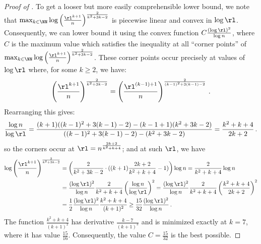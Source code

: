 \begin{proof}[Proof of ]
  To get a looser but more easily comprehensible lower bound, we note that $\max_{k \in \NN} \log \left(\frac{\rl^{k + 1}}{n}\right)^{\frac{2}{k^2 + 3 k - 2}}$ is piecewise linear and convex in $\log \rl$. Consequently,
  we can lower bound it using the convex function $C \frac{(\log \rl)^2}{\log n}$, where $C$ is the maximum value which satisfies the inequality at all ``corner points'' of $\max_{k \in \NN} \log \left(\frac{\rl^{k + 1}}{n}\right)^{\frac{2}{k^2 + 3 k - 2}}$. These corner points occur precisely at values of $\log \rl$ where, for some $k \ge 2$, we have:
  \begin{align*}
    \left(\frac{\rl^{k + 1}}{n}\right)^{\frac{2}{k^2 + 3 k - 2}} = \left(\frac{\rl^{(k-1) + 1}}{n}\right)^{\frac{2}{(k-1)^2 + 3 (k-1) - 2}} \,.
  \end{align*}
  Rearranging this gives:
  \begin{align*}
    \frac{\log n}{\log \rl} = \frac{(k+1) ((k-1)^2 + 3 (k-1) - 2) - (k-1+1) (k^2 + 3 k - 2)}{((k-1)^2 + 3 (k-1) - 2) - (k^2 + 3 k - 2)} = \frac{k^2 + k + 4}{2k + 2} \,.
  \end{align*}
  so the corners occur at $\rl = n^{\frac{2k + 2}{k^2 + k + 4}}$; and at such $\rl$, we have
  \begin{align*}
    \log \left(\frac{\rl^{k + 1}}{n}\right)^{\frac{2}{k^2 + 3 k - 2}} 
    &= \left(\frac{2}{k^2 + 3 k - 2} \cdot ((k+1) \frac{2 k + 2}{k^2 + k + 4} - 1)\right) \log n = \frac{2}{k^2 + k + 4} \log n \\
      &= \frac{(\log \rl)^2}{\log n} \frac{2}{k^2 + k + 4} \left(\frac{\log n}{\log \rl}\right)^2 = \frac{(\log \rl)^2}{\log n} \frac{2}{k^2 + k + 4} \left(\frac{k^2 + k + 4}{2k + 2}\right)^2 \\
      &= \frac{1}{2} \frac{(\log \rl)^2}{\log n} \frac{k^2 + k + 4}{(k+1)^2} \ge \frac{15}{32} \frac{(\log \rl)^2}{\log n} \,.
  \end{align*}
  The function $\frac{k^2 + k + 4}{(k+1)^2}$ has derivative $\frac{k-7}{(k+1)^3}$ and is minimized exactly at $k = 7$, where it has value $\frac{15}{16}$. Consequently, the value $C = \frac{15}{32}$ is the best possible.
\end{proof}

